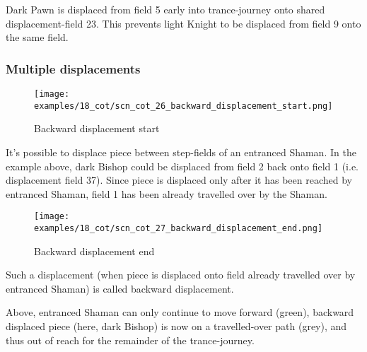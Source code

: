 Dark Pawn is displaced from field 5 early into trance-journey onto shared displacement-field
23. This prevents light Knight to be displaced from field 9 onto the same field.

\clearpage %

\subsubsection*{Multiple displacements}

\noindent
\begin{figure}[!h]
\vspace{-1.0\baselineskip}
\texttt{[image: examples/18\_cot/scn\_cot\_26\_backward\_displacement\_start.png]}
\caption{Backward displacement start}
\label{fig:scn_cot_26_backward_displacement_start}
\end{figure}

It's possible to displace piece between step-fields of an entranced Shaman. In the example
above, dark Bishop could be displaced from field 2 back onto field 1 (i.e. displacement
field 37). Since piece is displaced only after it has been reached by entranced Shaman,
field 1 has been already travelled over by the Shaman.

\clearpage %

\noindent
\begin{figure}[!h]
\texttt{[image: examples/18\_cot/scn\_cot\_27\_backward\_displacement\_end.png]}
\caption{Backward displacement end}
\label{fig:scn_cot_27_backward_displacement_end}
\end{figure}

Such a displacement (when piece is displaced onto field already travelled over
by entranced Shaman) is called backward displacement.

Above, entranced Shaman can only continue to move forward (green), backward displaced
piece (here, dark Bishop) is now on a travelled-over path (grey), and thus out of reach
for the remainder of the trance-journey.

\clearpage %

